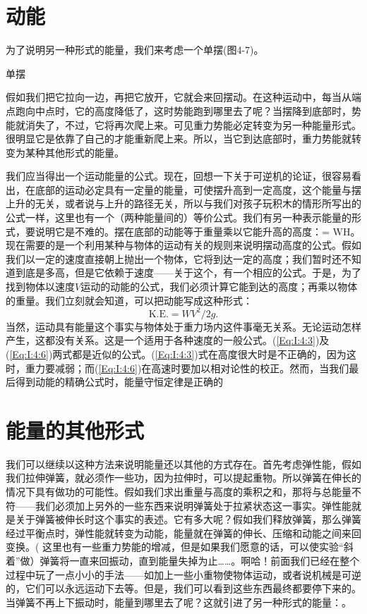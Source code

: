 \documentclass[11pt,oneside]{book}
\begin{document}
\begin{common-format}
\section{动能}
为了说明另一种形式的能量，我们来考虑一个单摆(图4-7)。
\begin{fig}{单摆}
\label{fig:单摆}
\end{fig}
假如我们把它拉向一边，再把它放开，它就会来回摆动。在这种运动中，每当从端点跑向中点时，它的高度降低了，这时势能跑到哪里去了呢？当摆降到底部时，势能就消失了，不过，它将再次爬上来。可见重力势能必定转变为另一种能量形式。很明显它是依靠了自己的才能重新爬上来。所以，当它到达底部时，重力势能就转变为某种其他形式的能量。

我们应当得出一个运动能量的公式。现在，回想一下关于可逆机的论证，很容易看出，在底部的运动必定具有一定量的能量，可使摆升高到一定高度，这个能量与摆上升的无关，或者说与上升的路径无关，所以与我们对孩子玩积木的情形所写出的公式一样，这里也有一个（两种能量间的）等价公式。我们有另一种表示能量的形式，要说明它是不难的。摆在底部的动能等于重量乘以它能升高的高度：= WH。现在需要的是一个利用某种与物体的运动有关的规则来说明摆动高度的公式。假如我们以一定的速度直接朝上抛出一个物体，它将到达一定的高度；我们暂时还不知道到底是多高，但是它依赖于速度——关于这个，有一个相应的公式。于是，为了找到物体以速度$ V $运动的动能的公式，我们必须计算它能到达的高度；再乘以物体的重量。我们立刻就会知道，可以把动能写成这种形式：
\begin{equation}
\label{Eq:I:4:6}
\text{K.E.}=WV^2/2g.
\end{equation}
当然，运动具有能量这个事实与物体处于重力场内这件事毫无关系。无论运动怎样产生，这都没有关系。这是一个适用于各种速度的一般公式。(\ref{Eq:I:4:3})及(\ref{Eq:I:4:6})两式都是近似的公式。(\ref{Eq:I:4:3})式在高度很大时是不正确的，因为这时，重力要减弱；而(\ref{Eq:I:4:6})在高速时要加以相对论性的校正。然而，当我们最后得到动能的精确公式时，能量守恒定律是正确的


\section{能量的其他形式}
我们可以继续以这种方法来说明能量还以其他的方式存在。首先考虑弹性能，假如我们拉伸弹簧，就必须作一些功，因为拉伸时，可以提起重物。所以弹簧在伸长的情况下具有做功的可能性。假如我们求出重量与高度的乘积之和，那将与总能量不符——我们必须加上另外的一些东西来说明弹簧处于拉紧状态这一事实。弹性能就是关于弹簧被伸长时这个事实的表述。它有多大呢？假如我们释放弹簧，那么弹簧经过平衡点时，弹性能就转变为动能，能量就在弹簧的伸长、压缩和动能之间来回变换。( 这里也有一些重力势能的增减，但是如果我们愿意的话，可以使实验“斜着”做）弹簧将一直来回振动，直到能量失掉为止……。啊哈！前面我们已经在整个过程中玩了一点小小的手法——如加上一些小重物使物体运动，或者说机械是可逆的，它们可以永远运动下去等。但是，我们可以看到这些东西最终都要停下来的。当弹簧不再上下振动时，能量到哪里去了呢？这就引进了另一种形式的能量：。


\end{common-format}
\end{document}
